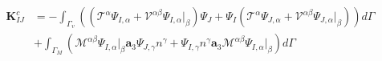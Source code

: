 \begin{subequations}
\begin{equation}
\begin{split}
        \boldsymbol K^c_{IJ} &= -\int_{\Gamma_v} \left ((\boldsymbol {\mathcal T}^\alpha \Psi_{I,\alpha} + \boldsymbol{\mathcal V}^{\alpha\beta} \Psi_{I,\alpha}\vert_\beta) \Psi_J + \Psi_I (\boldsymbol {\mathcal T}^\alpha \Psi_{J,\alpha} + \boldsymbol{\mathcal V}^{\alpha\beta}\Psi_{J,\alpha}\vert_\beta)\right ) d\Gamma \\
                             &+ \int_{\Gamma_M} (\mathcal M^{\alpha\beta} \Psi_{I,\alpha}\vert_\beta \boldsymbol a_3 \Psi_{J,\gamma}n^\gamma + \Psi_{I,\gamma}n^\gamma \boldsymbol a_3 \mathcal M^{\alpha\beta} \Psi_{I,\alpha}\vert_\beta) d\Gamma
\end{split}
\end{equation}
\end{subequations}
